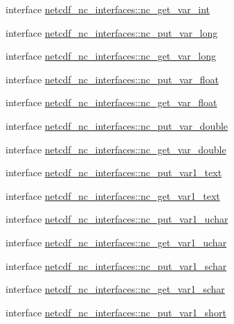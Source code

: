 \begin{DoxyCompactItemize}
\item 
interface \hyperlink{interfacenetcdf__nc__interfaces_1_1nc__get__var__int}{netcdf\+\_\+nc\+\_\+interfaces\+::nc\+\_\+get\+\_\+var\+\_\+int}
\item 
interface \hyperlink{interfacenetcdf__nc__interfaces_1_1nc__put__var__long}{netcdf\+\_\+nc\+\_\+interfaces\+::nc\+\_\+put\+\_\+var\+\_\+long}
\item 
interface \hyperlink{interfacenetcdf__nc__interfaces_1_1nc__get__var__long}{netcdf\+\_\+nc\+\_\+interfaces\+::nc\+\_\+get\+\_\+var\+\_\+long}
\item 
interface \hyperlink{interfacenetcdf__nc__interfaces_1_1nc__put__var__float}{netcdf\+\_\+nc\+\_\+interfaces\+::nc\+\_\+put\+\_\+var\+\_\+float}
\item 
interface \hyperlink{interfacenetcdf__nc__interfaces_1_1nc__get__var__float}{netcdf\+\_\+nc\+\_\+interfaces\+::nc\+\_\+get\+\_\+var\+\_\+float}
\item 
interface \hyperlink{interfacenetcdf__nc__interfaces_1_1nc__put__var__double}{netcdf\+\_\+nc\+\_\+interfaces\+::nc\+\_\+put\+\_\+var\+\_\+double}
\item 
interface \hyperlink{interfacenetcdf__nc__interfaces_1_1nc__get__var__double}{netcdf\+\_\+nc\+\_\+interfaces\+::nc\+\_\+get\+\_\+var\+\_\+double}
\item 
interface \hyperlink{interfacenetcdf__nc__interfaces_1_1nc__put__var1__text}{netcdf\+\_\+nc\+\_\+interfaces\+::nc\+\_\+put\+\_\+var1\+\_\+text}
\item 
interface \hyperlink{interfacenetcdf__nc__interfaces_1_1nc__get__var1__text}{netcdf\+\_\+nc\+\_\+interfaces\+::nc\+\_\+get\+\_\+var1\+\_\+text}
\item 
interface \hyperlink{interfacenetcdf__nc__interfaces_1_1nc__put__var1__uchar}{netcdf\+\_\+nc\+\_\+interfaces\+::nc\+\_\+put\+\_\+var1\+\_\+uchar}
\item 
interface \hyperlink{interfacenetcdf__nc__interfaces_1_1nc__get__var1__uchar}{netcdf\+\_\+nc\+\_\+interfaces\+::nc\+\_\+get\+\_\+var1\+\_\+uchar}
\item 
interface \hyperlink{interfacenetcdf__nc__interfaces_1_1nc__put__var1__schar}{netcdf\+\_\+nc\+\_\+interfaces\+::nc\+\_\+put\+\_\+var1\+\_\+schar}
\item 
interface \hyperlink{interfacenetcdf__nc__interfaces_1_1nc__get__var1__schar}{netcdf\+\_\+nc\+\_\+interfaces\+::nc\+\_\+get\+\_\+var1\+\_\+schar}
\item 
interface \hyperlink{interfacenetcdf__nc__interfaces_1_1nc__put__var1__short}{netcdf\+\_\+nc\+\_\+interfaces\+::nc\+\_\+put\+\_\+var1\+\_\+short}

\end{DoxyCompactItemize}
